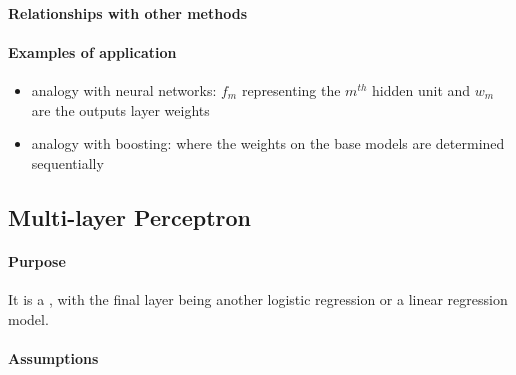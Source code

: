 \paragraph{Relationships with other methods}
\paragraph{Examples of application}
\begin{itemize}
    \item analogy with neural networks: $f_{m}$ representing the $m^{th}$ hidden unit 
        and $w_{m}$ are the outputs layer weights
    \item analogy with boosting: where the weights on the base models are determined 
        sequentially
\end{itemize}


\subsection{Multi-layer Perceptron}
\paragraph{Purpose}
It is a , with the final layer
being another logistic regression or a linear regression model.

\paragraph{Assumptions}
